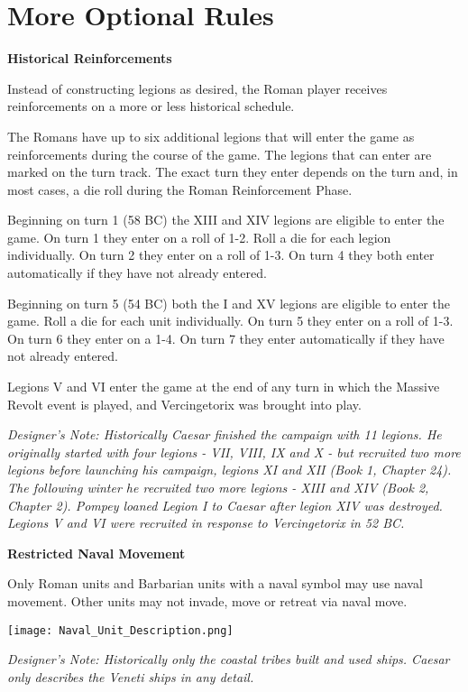 \pagebreak[4]
\section{More Optional Rules}
\par

\textbf{Historical Reinforcements}

Instead of constructing legions as desired, the Roman player receives reinforcements on a more or less historical schedule.

The Romans have up to six additional legions that will enter the game as reinforcements during the course of the game. The legions that can enter are marked on the turn track. The exact turn they enter depends on the turn and, in most cases, a die roll during the Roman Reinforcement Phase.

Beginning on turn 1 (58 BC) the XIII and XIV legions are eligible to enter the game. On turn 1 they enter on a roll of 1-2. Roll a die for each legion individually. On turn 2 they enter on a roll of 1-3. On turn 4 they both enter automatically if they have not already entered.

Beginning on turn 5 (54 BC) both the I and XV legions are eligible to enter the game. Roll a die for each unit individually. On turn 5 they enter on a roll of 1-3. On turn 6 they enter on a 1-4. On turn 7 they enter automatically if they have not already entered.

Legions V and VI enter the game at the end of any turn in which the Massive Revolt event is played, and Vercingetorix was brought into play.

\textit{Designer's Note: Historically Caesar finished the campaign with 11 legions. He originally started with four legions - VII, VIII, IX and X - but recruited two more legions before launching his campaign, legions XI and XII (Book 1, Chapter 24). The following winter he recruited two more legions - XIII and XIV (Book 2, Chapter 2). Pompey loaned Legion I to Caesar after legion XIV was destroyed. Legions V and VI were recruited in response to Vercingetorix in 52 BC.}

\textbf{Restricted Naval Movement}

Only Roman units and Barbarian units with a naval symbol may use naval movement. Other units may not invade, move or retreat via naval move.

\texttt{[image: Naval\_Unit\_Description.png]}

\textit{Designer's Note: Historically only the coastal tribes built and used ships. Caesar only describes the Veneti ships in any detail.}